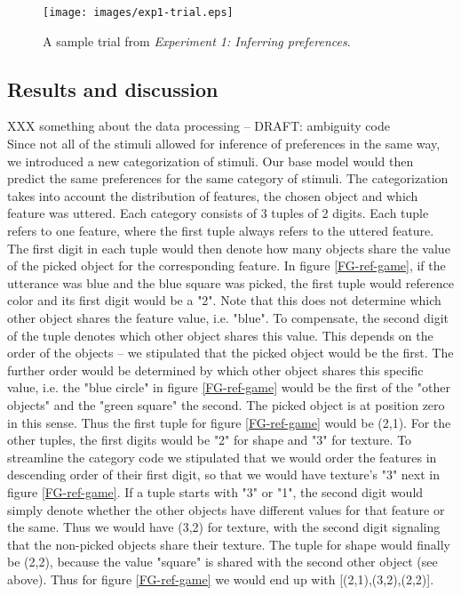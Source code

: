\documentclass[10pt,a4paper]{article}
\begin{document}
\begin{figure}[ht]
	\centering
	\texttt{[image: images/exp1-trial.eps]}
	\caption{A sample trial from \emph{Experiment 1: Inferring preferences}.}\label{exp1-trial}
\end{figure}

\subsection{Results and discussion}

XXX something about the data processing -- DRAFT: ambiguity code\\
Since not all of the stimuli allowed for inference of preferences in the same way, we introduced a new categorization of stimuli. Our base model would then predict the same preferences for the same category of stimuli. The categorization takes into account the distribution of features, the chosen object and which feature was uttered. Each category consists of 3 tuples of 2 digits. Each tuple refers to one feature, where the first tuple always refers to the uttered feature. The first digit in each tuple would then denote how many objects share the value of the picked object for the corresponding feature. In figure \ref{FG-ref-game}, if the utterance was blue and the blue square was picked, the first tuple would reference color and its first digit would be a "2". Note that this does not determine which other object shares the feature value, i.e. "blue". To compensate, the second digit of the tuple denotes which other object shares this value. This depends on the order of the objects -- we stipulated that the picked object would be the first. The further order would be determined by which other object shares this specific value, i.e. the "blue circle" in figure \ref{FG-ref-game} would be the first of the "other objects" and the "green square" the second. The picked object is at position zero in this sense. Thus the first tuple for figure \ref{FG-ref-game} would be (2,1). For the other tuples, the first digits would be "2" for shape and "3" for texture. To streamline the category code we stipulated that we would order the features in descending order of their first digit, so that we would have texture's "3" next in figure \ref{FG-ref-game}. If a tuple starts with "3" or "1", the second digit would simply denote whether the other objects have different values for that feature or the same. Thus we would have (3,2) for texture, with the second digit signaling that the non-picked objects share their texture. The tuple for shape would finally be (2,2), because the value "square" is shared with the second other object (see above). Thus for figure \ref{FG-ref-game} we would end up with [(2,1),(3,2),(2,2)].
\end{document}
